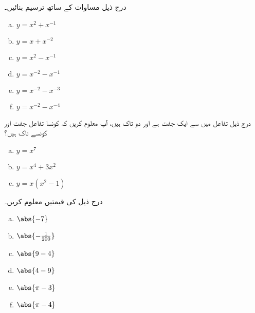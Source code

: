 درج ذیل مساوات کے ساتھ ترسیم بنائیں۔
\begin{multicols}{3}
\begin{enumerate}[a.]
\item \( y=x^{2}+x^{-1} \)
\item \(y=x+x^{-2}  \)
\item \(y=x^{2}-x^{-1}  \)
\item \(y=x^{-2}-x^{-1}  \)
\item \( y=x^{-2}-x^{-3} \)
\item \( y=x^{-2}-x^{-4}  \)
\end{enumerate}
\end{multicols}
درج ذیل تفاعل میں سے ایک جفت ہے اور دو تاک ہیں، آپ معلوم کریں کہ کونسا تفاعل جفت اور کونسے تاک ہیں؟
\begin{multicols}{3}
\begin{enumerate}[a.]
\item \( y=x^{7} \)
\item \( y=x^{4}+3x^{2} \)
\item \( y=x(x^{2}-1) \)
 \end{enumerate}
\end{multicols}

درج ذیل کی قیمتیں معلوم کریں۔
\begin{multicols}{3}
\begin{enumerate}[a.]
\item \(  \abs{-7}\)
\item \( \abs{-\frac{1}{200}} \)
\item \( \abs{9-4} \)
\item \(\abs{4-9}  \)
\item \( \abs{\pi -3} \)
\item \( \abs{\pi -4} \)
\end{enumerate}
\end{multicols}

